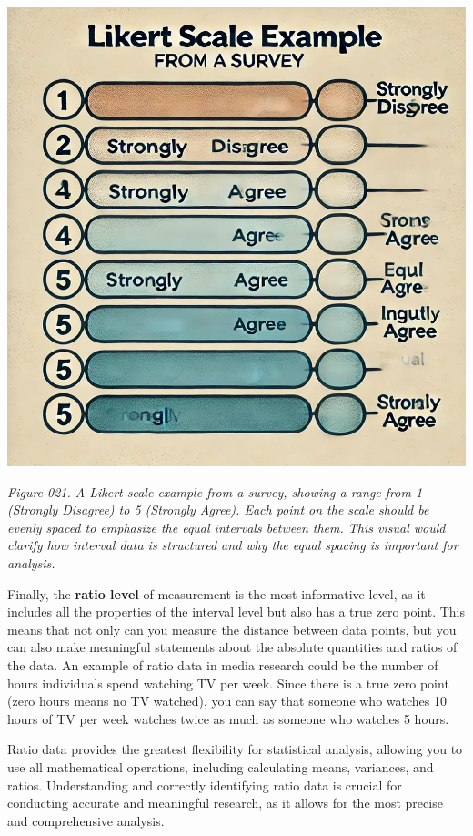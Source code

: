 \documentclass[
]{book}
\begin{document}
\includegraphics[width=1\linewidth,height=\textheight,keepaspectratio]{images/fig021.jpg}

\emph{Figure 021. A Likert scale example from a survey, showing a range from 1 (Strongly Disagree) to 5 (Strongly Agree). Each point on the scale should be evenly spaced to emphasize the equal intervals between them. This visual would clarify how interval data is structured and why the equal spacing is important for analysis.}

Finally, the \textbf{ratio level} of measurement is the most informative level, as it includes all the properties of the interval level but also has a true zero point. This means that not only can you measure the distance between data points, but you can also make meaningful statements about the absolute quantities and ratios of the data. An example of ratio data in media research could be the number of hours individuals spend watching TV per week. Since there is a true zero point (zero hours means no TV watched), you can say that someone who watches 10 hours of TV per week watches twice as much as someone who watches 5 hours.

Ratio data provides the greatest flexibility for statistical analysis, allowing you to use all mathematical operations, including calculating means, variances, and ratios. Understanding and correctly identifying ratio data is crucial for conducting accurate and meaningful research, as it allows for the most precise and comprehensive analysis.
\end{document}
